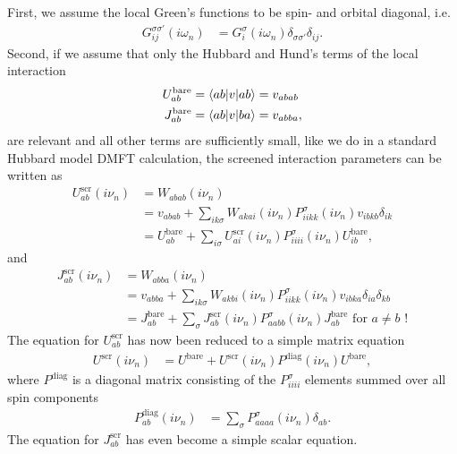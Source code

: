 \documentclass[12pt,a4paper]{scrartcl}
\numberwithin{equation}{section}
\begin{document}
First, we assume the local Green's functions to be spin- and orbital diagonal, i.e.
\begin{align}
 G^{\sigma\sigma'}_{ij}(i\omega_n)
 &= G^{\sigma}_{i}(i\omega_n)\delta_{\sigma\sigma'}\delta_{ij}.
\end{align}
Second, if we assume that only the Hubbard and Hund's terms of the local interaction
\begin{align}
 U^{\mathrm{bare}}_{ab} &= \braket{ab|v|ab} = v_{abab} \\
 J^{\mathrm{bare}}_{ab} &= \braket{ab|v|ba} = v_{abba} ,
\end{align}
are relevant and all other terms are sufficiently small, like 
we do in a standard Hubbard model DMFT calculation, the screened interaction parameters can be written as
\begin{align}
U^{\mathrm{scr}}_{ab}(i\nu_n) &= W_{abab}(i\nu_n) \\
%
&= v_{abab}  + \sum_{ i k \sigma}
                     W_{akai} (i\nu_n) P^{\sigma}_{iikk}(i\nu_n)
                     v_{ibkb}\delta_{ik} \\
%
& = U^{\mathrm{bare}}_{ab}  + \sum_{i \sigma}
                     U^{\mathrm{scr}}_{ai} (i\nu_n) P^{\sigma}_{iiii}(i\nu_n)
                     U^{\mathrm{bare}}_{ib} , 
\end{align}
and 
\begin{align}
J^{\mathrm{scr}}_{ab}(i\nu_n) &= W_{abba}(i\nu_n) \\
%
&= v_{abba}  + \sum_{ i k \sigma}
                     W_{akbi} (i\nu_n) P^{\sigma}_{iikk}(i\nu_n)
                     v_{ibka}\delta_{ia}\delta_{kb} \\
%
& = J^{\mathrm{bare}}_{ab}  + \sum_{\sigma}
                     J^{\mathrm{scr}}_{ab} (i\nu_n) P^{\sigma}_{aabb}(i\nu_n)
                     J^{\mathrm{bare}}_{ab} \mbox{ for } a\neq b \mbox{ !}
\end{align}
The equation for $U^{\mathrm{scr}}_{ab}$ has now been reduced to a simple matrix equation
\begin{align}
U^{\mathrm{scr}}(i\nu_n) 
& = U^{\mathrm{bare}}  + U^{\mathrm{scr}} (i\nu_n) P^{\mathrm{diag}}(i\nu_n) U^{\mathrm{bare}},
\end{align}
where $P^{\mathrm{diag}}$ is a diagonal matrix consisting of the $P^{\sigma}_{iiii}$ elements 
summed over all spin components
\begin{align}
 P^{\mathrm{diag}}_{ab}(i\nu_n) &= \sum_{\sigma} P^{\sigma}_{aaaa}(i\nu_n) \delta_{ab}.
\end{align}
The equation for $J^{\mathrm{scr}}_{ab}$ has even become a simple scalar equation.
\end{document}

